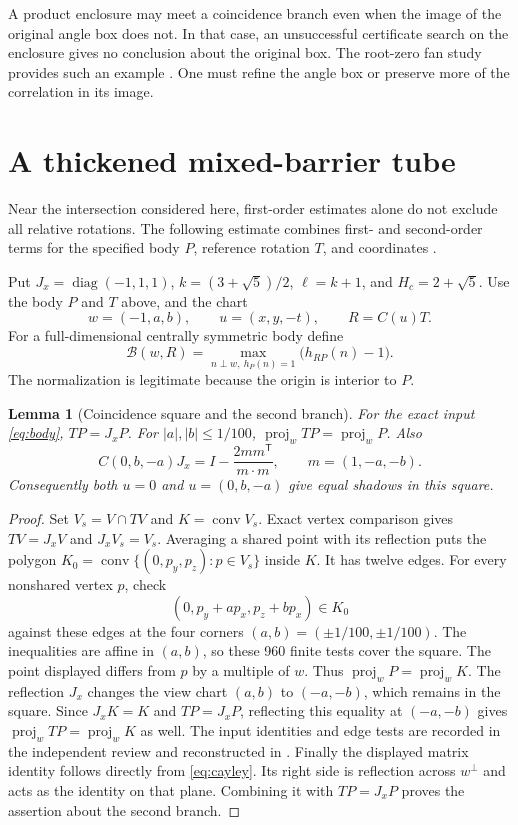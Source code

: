 \documentclass[11pt]{amsart}
\newcommand{\conv}{\operatorname{conv}}
\newcommand{\diag}{\operatorname{diag}}
\newcommand{\proj}{\operatorname{proj}}
\newtheorem{lemma}[theorem]{Lemma}
\theoremstyle{definition}
\theoremstyle{remark}
\begin{document}
A product enclosure may meet a coincidence branch even when the image
of the original angle box does not. In that case, an unsuccessful
certificate search on the enclosure gives no conclusion about the
original box. The root-zero fan study provides such an example
\cite{fan}. One must refine the angle box
or preserve more of the correlation in its image.

\section{A thickened mixed-barrier tube}\label{sec:tube}

Near the intersection considered here, first-order estimates alone do
not exclude all relative rotations. The following estimate combines
first- and second-order terms for the specified body $P$, reference
rotation $T$, and coordinates \cite{tube,review}.

Put $J_x=\diag(-1,1,1)$, $k=(3+\sqrt5)/2$, $\ell=k+1$, and
$H_c=2+\sqrt5$. Use the body $P$ and $T$ above, and the chart
\[
 w=(-1,a,b),\qquad u=(x,y,-t),\qquad R=C(u)T.
\]
For a full-dimensional centrally symmetric body define
\begin{equation}\label{eq:barrier}
 \mathcal B(w,R)=\max_{n\perp w,\ h_P(n)=1}\bigl(h_{RP}(n)-1\bigr).
\end{equation}
The normalization is legitimate because the origin is interior to $P$.

\begin{lemma}[Coincidence square and the second branch]\label{lem:square}
For the exact input \eqref{eq:body}, $TP=J_xP$. For $|a|,|b|\le1/100$,
$\proj_wTP=\proj_wP$. Also
\[
 C(0,b,-a)J_x=I-\frac{2mm^{\mathsf T}}{m\cdot m},\qquad m=(1,-a,-b).
\]
Consequently both $u=0$ and $u=(0,b,-a)$ give equal shadows in this square.
\end{lemma}
\begin{proof}
Set $V_s=V\cap TV$ and $K=\conv V_s$. Exact vertex comparison gives
$TV=J_xV$ and $J_xV_s=V_s$. Averaging a shared point with its reflection
puts the polygon
$K_0=\conv\{(0,p_y,p_z):p\in V_s\}$ inside $K$.
It has twelve edges. For every nonshared vertex $p$, check
\[
 (0,p_y+ap_x,p_z+bp_x)\in K_0
\]
against these edges at the four corners $(a,b)=(\pm1/100,\pm1/100)$.
The inequalities are affine in $(a,b)$, so these 960 finite tests cover
the square. The point displayed differs from $p$ by a multiple of $w$.
Thus $\proj_wP=\proj_wK$. The reflection $J_x$ changes the view chart
$(a,b)$ to $(-a,-b)$, which remains in the square. Since $J_xK=K$ and
$TP=J_xP$, reflecting this equality at $(-a,-b)$ gives
$\proj_wTP=\proj_wK$ as well.
The input identities and edge tests are recorded in the independent
review \cite{review} and reconstructed in \cite{tube}.
Finally the displayed matrix identity follows directly from
\eqref{eq:cayley}. Its right side is reflection across $w^\perp$ and
acts as the identity on that plane. Combining it with $TP=J_xP$ proves
the assertion about the second branch.
\end{proof}
\end{document}
